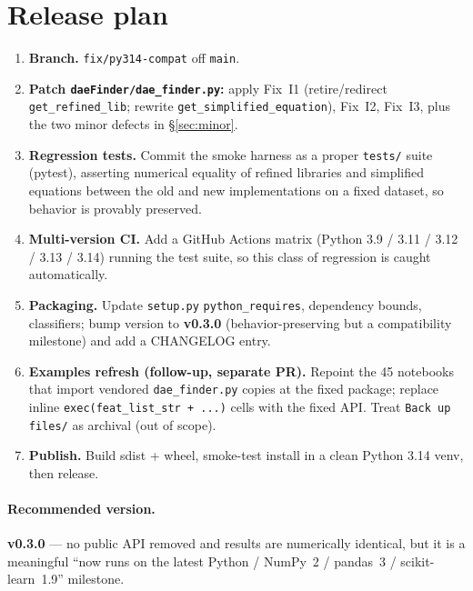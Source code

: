 \documentclass[11pt]{article}
\newcommand{\code}[1]{\texttt{\small #1}}
\begin{document}
\section{Release plan}

\begin{enumerate}[itemsep=3pt]
  \item \textbf{Branch.} \code{fix/py314-compat} off \code{main}.
  \item \textbf{Patch \code{daeFinder/dae\_finder.py}:} apply Fix~I1 (retire/redirect
        \code{get\_refined\_lib}; rewrite \code{get\_simplified\_equation}),
        Fix~I2, Fix~I3, plus the two minor defects in \S\ref{sec:minor}.
  \item \textbf{Regression tests.} Commit the smoke harness as a proper
        \code{tests/} suite (pytest), asserting numerical equality of refined
        libraries and simplified equations between the old and new
        implementations on a fixed dataset, so behavior is provably preserved.
  \item \textbf{Multi-version CI.} Add a GitHub Actions matrix
        (Python 3.9 / 3.11 / 3.12 / 3.13 / 3.14) running the test suite, so this
        class of regression is caught automatically.
  \item \textbf{Packaging.} Update \code{setup.py} \code{python\_requires},
        dependency bounds, classifiers; bump version to \textbf{v0.3.0}
        (behavior-preserving but a compatibility milestone) and add a CHANGELOG
        entry.
  \item \textbf{Examples refresh (follow-up, separate PR).} Repoint the 45
        notebooks that import vendored \code{dae\_finder.py} copies at the fixed
        package; replace inline \code{exec(feat\_list\_str + ...)} cells with the
        fixed API. Treat \code{Back up files/} as archival (out of scope).
  \item \textbf{Publish.} Build sdist + wheel, smoke-test install in a clean
        Python 3.14 venv, then release.
\end{enumerate}

\paragraph{Recommended version.} \textbf{v0.3.0} --- no public API removed and
results are numerically identical, but it is a meaningful ``now runs on the latest
Python / NumPy~2 / pandas~3 / scikit-learn~1.9'' milestone.
\end{document}
